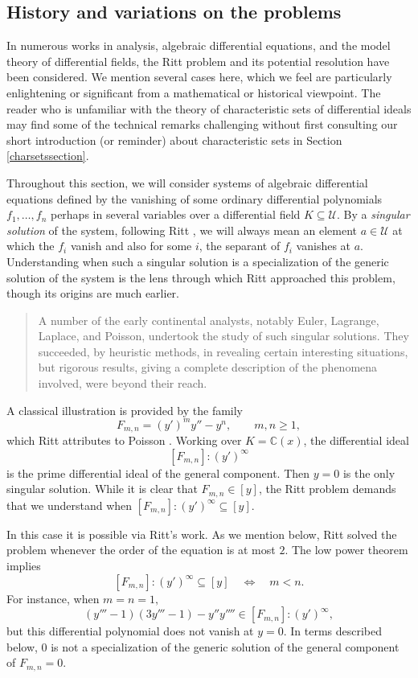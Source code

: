 \documentclass[12pt]{amsart}
\theoremstyle{definition}
\newcounter{cases}[theorem]
\numberwithin{subcase}{cases}
\theoremstyle{remark}
\newcommand{\mc}[1]{\mathcal{#1}}
\begin{document}
\subsection{History and variations on the problems} 
In numerous works in analysis, algebraic differential equations, and the model theory of differential fields, the Ritt problem and its potential resolution have been considered. We mention several cases here, which we feel are particularly enlightening or significant from a mathematical or historical viewpoint. The reader who is unfamiliar with the theory of characteristic sets of differential ideals may find some of the technical remarks challenging without first consulting our short introduction (or reminder) about characteristic sets in Section \ref{charsetssection}. 

Throughout this section, we will consider systems of algebraic differential equations defined by the vanishing of some ordinary differential polynomials $f_1, \ldots, f_n$ perhaps in several variables over a differential field $K \subseteq \mc U$. By a \emph{singular solution} of the system, following Ritt \cite{ritt1936singular}, we will always mean an element $a \in \mc U$ at which the $f_i$ vanish and also for some $i$, the separant of $f_i$ vanishes at $a$. Understanding when such a singular solution is a specialization of the generic solution of the system is the lens through which Ritt approached this problem, though its origins are much earlier.

\begin{quote}
A number of the early continental analysts, notably Euler, Lagrange, Laplace, and Poisson, undertook the study of such singular solutions. They succeeded, by heuristic methods, in revealing certain interesting situations, but rigorous results, giving a complete description of the phenomena involved, were beyond their reach. \cite{ritt1936singular}
\end{quote}

A classical illustration is provided by the family
\[
F_{m,n}=(y')^m y''-y^n,\qquad m,n\geq 1,
\]
which Ritt attributes to Poisson \cite{Poisson1806} \cite[Chapter~III, \S38, p.~78]{Ritt50}. Working over $K=\mathbb{C}(x)$, the differential ideal 
\[
[F_{m,n}]:(y')^\infty
\]
is the prime differential ideal of the general component. Then $y=0$ is the only singular solution. While it is clear that $F_{m,n} \in [y]$, the Ritt problem demands that we understand when $[F_{m,n}]:(y')^\infty \subseteq [y].$

In this case it is possible via Ritt's work. As we mention below, Ritt solved the problem whenever the order of the equation is at most $2$. The low power theorem \cite[Chapter~III, \S20, p.~65]{Ritt50} implies
\[
[F_{m,n}]:(y')^\infty \subseteq [y] \quad\Longleftrightarrow\quad m<n.
\]
For instance, when $m=n=1,$ 
\[
(y'''-1)(3y'''-1)-y''y''''\in [F_{m,n}]:(y')^\infty,
\]
but this differential polynomial does not vanish at $y=0$. In terms described below, $0$ is not a specialization of the generic solution of the general component of $F_{m,n}=0.$
\end{document}
